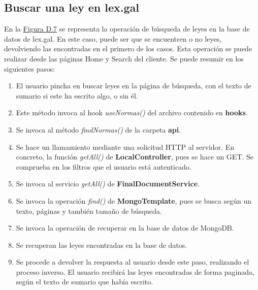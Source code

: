 \subsection{Buscar una ley en lex.gal}

En la \hyperref[enlaceDBuscarLEXGAL]{Figura D.7} se representa la operación de búsqueda de leyes en la base de datos de lex.gal. En este caso, puede ser que se encuentren o no leyes, devolviendo las encontradas en el primero de los casos. Esta operación se puede realizar desde las páginas Home y Search del cliente. Se puede resumir en los siguientes pasos:

\begin{enumerate}
    \item El usuario pincha en buscar leyes en la página de búsqueda, con el texto de sumario si este ha escrito algo, o sin él.
    \item Este método invoca al hook {\it useNormas()} del archivo contenido en {\bf hooks}.
    \item Se invoca al método {\it findNormas()} de la carpeta {\bf api}.
    \item Se hace un llamamiento mediante una solicitud HTTP al servidor. En concreto, la función {\it getAll()} de {\bf LocalController}, pues se hace un GET. Se comprueba en los filtros que el usuario está autenticado.
    \item Se invoca al servicio {\it getAll()} de {\bf FinalDocumentService}.
    \item Se invoca la operación {\it find()} de {\bf MongoTemplate}, pues se busca según un texto, páginas y también tamaño de búsqueda.
    \item Se invoca la operación de recuperar en la base de datos de MongoDB.
    \item Se recuperan las leyes encontradas en la base de datos.
    \item Se procede a devolver la respuesta al usuario desde este paso, realizando el proceso inverso. El usuario recibirá las leyes encontradas de forma paginada, según el texto de sumario que había escrito.
\end{enumerate}
